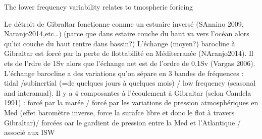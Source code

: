 The lower frequency variability relates to tmospheric foricing




Le détroit de Gibraltar fonctionne comme un estuaire inversé (SAnnino 2009, Naranjo2014,etc…) (parce que dans estaire couche du haut va vers l’océan alors qu’ici couche du haut rentre dans bassin?)
L’échange (moyen?) barocline à Gibraltar est forcé par la perte de flottabilité en Méditerranée (NAranjo2014). Il ets de l’rdre de 1Sv alors que l’échange net est de l’ordre de 0,1Sv (Vargas 2006). L’échange barocline a des variations qu’on sépare en 3 bandes de fréquences : tidal /subinertial (=de quelques jours à quelques mois) / low frequency (seasonal and interanual).
Il y a 4 composantes à l’écoulement à Gibraltar (selon Candela 1991) : forcé par la marée / forcé par les variations de pression atmosphériques en Med (effet baromètre inverse, force la surafce libre et donc le flot à travers Gibraltar)/ forcées oar le gardient de pression entre la Med et l’Atlantique / associé aux ISW\\





